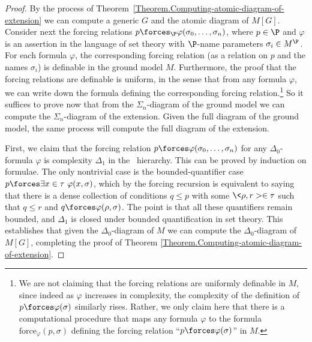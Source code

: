 \documentclass{amsart}
\begin{document}
\begin{proof}
By the process of Theorem~\ref{Theorem.Computing-atomic-diagram-of-extension} we can compute a generic $G$ and the atomic diagram of $M[G]$. Consider next the forcing relations $p\forces_\P\varphi(\sigma_0,\ldots,\sigma_n)$, where $p\in\P$ and $\varphi$ is an assertion in the language of set theory with $\P$-name parameters $\sigma_i\in M^\P$. For each formula $\varphi$, the corresponding forcing relation (as a relation on $p$ and the names $\sigma_i$) is definable in the ground model $M$. Furthermore, the proof that the forcing relations are definable is uniform, in the sense that from any formula $\varphi$, we can write down the formula defining the corresponding forcing relation.\footnote{We are not claiming that the forcing relations are uniformly definable in $M$, since indeed as $\varphi$ increases in complexity, the complexity of the definition of $p\forces\varphi(\sigma)$ similarly rises. Rather, we only claim here that there is a computational procedure that maps any formula $\varphi$ to the formula $\text{force}_\varphi(p,\sigma)$ defining the forcing relation ``$p\forces\varphi(\sigma)$'' in $M$.}
So it suffices to prove now that from the $\Sigma_n$-diagram of the ground model we can compute the $\Sigma_n$-diagram of the extension. Given the full diagram of the ground model, the same process will compute the full diagram of the extension.

First, we claim that the forcing relation $p \forces \varphi(\sigma_0, \ldots, \sigma_n)$ for any $\Delta_0$-formula $\varphi$ is complexity $\Delta_1$ in the \Levy\ hierarchy. This can be proved by induction on formulae. The only nontrivial case is the bounded-quantifier case $p\forces\exists x\in\tau\ \varphi(x,\sigma)$, which by the forcing recursion is equivalent to saying that there is a dense collection of conditions $q\leq p$ with some $\<\rho,r>\in\tau$ such that $q\leq r$ and $q\forces\varphi(\rho,\sigma)$. The point is that all these quantifiers remain bounded, and $\Delta_1$ is closed under bounded quantification in set theory. This establishes that given the $\Delta_0$-diagram of $M$ we can compute the $\Delta_0$-diagram of $M[G]$, completing the proof of Theorem \ref{Theorem.Computing-atomic-diagram-of-extension}.


\end{proof}
\end{document}
